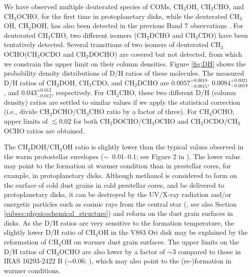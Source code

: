 \documentclass[twocolumn, twocolappendix, astrosymb, times]{aastex631}
\newcommand{\methanol}{CH$_3$OH\xspace}
\newcommand{\acetaldehyde}{CH$_3$CHO\xspace}
\newcommand{\methylformate}{CH$_3$OCHO\xspace}
\begin{document}
We have observed multiple deuterated species of COMs, \methanol, \acetaldehyde, and \methylformate, for the first time in protoplanetary disks, while the deuterated \methanol, CH$_2$DOH, has also been detected in the previous Band 7 observations \citep{Lee2019}. For deuterated \acetaldehyde, two different isomers (CH$_2$DCHO and CH$_3$CDO) have been tentatively detected. Several transitions of two isomers of deuterated \methylformate (CH$_3$OCDO and CH$_2$DOCHO) are covered but not detected, from which we constrain the upper limit on their column densities. Figure \ref{fig:DH} shows the probability density distributions of D/H ratios of these molecules. The measured D/H ratios of CH$_2$DOH, CH$_3$CDO, and CH$_2$DCHO are $0.0057_{-0.0015}^{+0.0018}$, $0.0084_{-0.0019}^{+0.0021}$, and $0.043_{-0.012}^{+0.012}$, respectively. For \acetaldehyde, these two different D/H (column density) ratios are settled to similar values if we apply the statistical correction (i.e., divide CH$_2$DCHO/\acetaldehyde ratio by a factor of three). For \methylformate, upper limits of $\lesssim0.02$ for both CH$_2$DOCHO/\methylformate and CH$_3$OCDO/\methylformate ratios are obtained.


The CH$_2$DOH/\methanol ratio is slightly lower than the typical values observed in the warm protostellar envelopes ($\sim$~0.01--0.1; see Figure 2 in \citealt{Drozdovskaya2021}).  The lower value may point to the formation at warmer condition than in prestellar cores, for example, in protoplanetary disks. Although methanol is considered to form on the surface of cold dust grains in cold prestellar cores, and be delivered to protoplanetary disks, it can be destroyed by the UV/X-ray radiation and/or energetic particles such as cosmic rays from the central star (\citealt{Notsu2021}, see also Section \ref{subsec:physicochemical_structure}) and reform on the dust grain surfaces in disks. As the D/H ratios are very sensitive to the formation temperature, the slightly lower D/H ratio of \methanol in the V883 Ori disk may be explained by the reformation of \methanol on warmer dust grain surfaces. The upper limits on the D/H ratios of \methylformate are also lower by a factor of $\sim3$ compared to those in IRAS 16293-2422 B ($\sim0.06$; \citealt{Jorgensen2018}), which may also point to the (re-)formation in warmer conditions.
\end{document}
